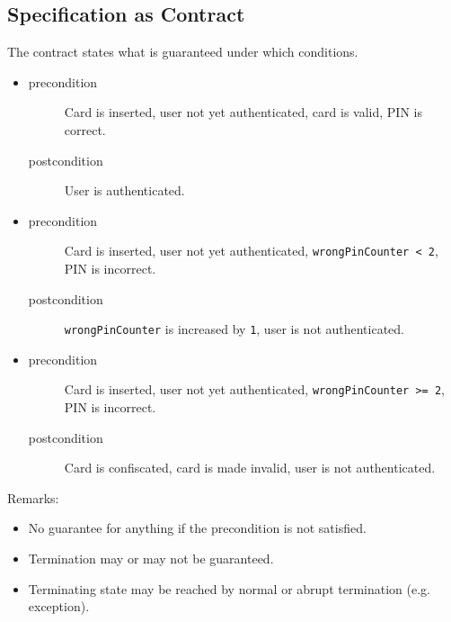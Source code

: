 		\subsection{Specification as Contract}
			The contract states what is guaranteed under which conditions.
			\begin{itemize}
				\item[]
					\begin{description}
						\item[precondition] Card is inserted, user not yet authenticated, card is valid, PIN is correct.
						\item[postcondition] User is authenticated.
					\end{description}
				\item[]
					\begin{description}
						\item[precondition] Card is inserted, user not yet authenticated, \texttt{wrongPinCounter < 2}, PIN is incorrect.
						\item[postcondition] \texttt{wrongPinCounter} is increased by \texttt{1}, user is not authenticated.
					\end{description}
				\item[]
					\begin{description}
						\item[precondition] Card is inserted, user not yet authenticated, \texttt{wrongPinCounter >= 2}, PIN is incorrect.
						\item[postcondition] Card is confiscated, card is made invalid, user is not authenticated.
					\end{description}
			\end{itemize}
		
		
			Remarks:
			\begin{itemize}
				\item No guarantee for anything if the precondition is not satisfied.
				\item Termination may or may not be guaranteed.
				\item Terminating state may be reached by normal or abrupt termination (e.g. exception).
			\end{itemize}

